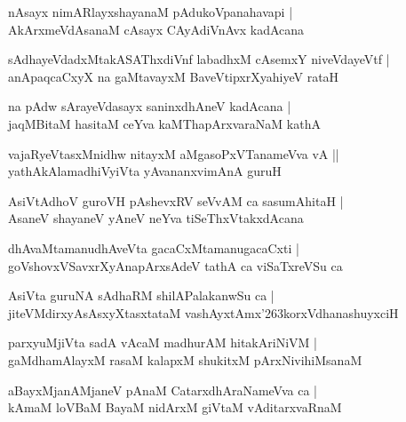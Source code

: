 \documentclass[twoside,12pt,openright]{book}
\def\S{\char'263}
\newcounter{shloka}[chapter]
\begin{document}
\begin{shloka}
nAsayx nimARlayxshayanaM pAdukoVpanahavapi |\\
AkArxmeVdAsanaM cAsayx CAyAdiVnAvx kadAcana 
\end{shloka}

\begin{shloka}
sAdhayeVdadxMtakASAThxdiVnf labadhxM cAsemxY niveVdayeVtf |\\
anApaqcaCxyX na gaMtavayxM BaveVtipxrXyahiyeV rataH 
\end{shloka}

\begin{shloka}
na pAdw sArayeVdasayx saninxdhAneV kadAcana |\\
jaqMBitaM hasitaM ceYva kaMThapArxvaraNaM kathA 
\end{shloka}

\begin{shloka}
vajaRyeVtasxMnidhw nitayxM aMgasoPxVTanameVva vA ||\\
yathAkAlamadhiVyiVta yAvananxvimAnA guruH
\end{shloka}

\begin{shloka}
AsiVtAdhoV guroVH pAshevxRV seVvAM ca sasumAhitaH |\\
AsaneV shayaneV yAneV neYva tiSeThxVtakxdAcana 
\end{shloka}

\begin{shloka}
dhAvaMtamanudhAveVta gacaCxMtamanugacaCxti |\\
goVshovxVSavxrXyAnapArxsAdeV tathA ca viSaTxreVSu ca 
\end{shloka}

\begin{shloka}
AsiVta guruNA sAdhaRM shilAPalakanwSu ca |\\
jiteVMdirxyAsAsxyXtasxtataM vashAyxtAmx\S korxVdhanashuyxciH
\end{shloka}

\begin{shloka}
parxyuMjiVta sadA vAcaM madhurAM hitakAriNiVM |\\
gaMdhamAlayxM rasaM kalapxM shukitxM pArxNivihiMsanaM 
\end{shloka}

\begin{shloka}
aBayxMjanAMjaneV pAnaM CatarxdhAraNameVva ca |\\
kAmaM loVBaM BayaM nidArxM giVtaM vAditarxvaRnaM 
\end{shloka}
\end{document}

